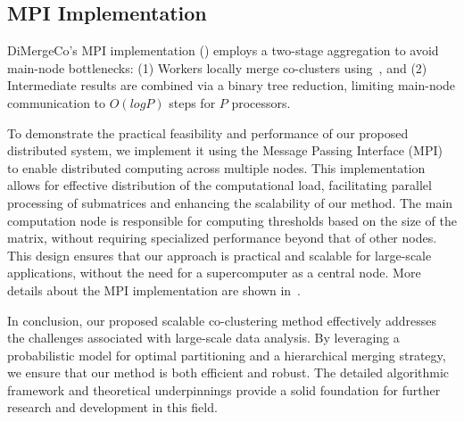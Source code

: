 \documentclass[journal]{IEEEtran}
\begin{document}
\subsection{MPI Implementation}
\label{subsec:mpi_implementation}
DiMergeCo's MPI implementation () employs a two-stage aggregation to avoid main-node bottlenecks: (1) Workers locally merge co-clusters using~, and (2) Intermediate results are combined via a binary tree reduction, limiting main-node communication to $O(log P)$ steps for $P$ processors.

To demonstrate the practical feasibility and performance of our proposed distributed system, we implement it using the Message Passing Interface (MPI) to enable distributed computing across multiple nodes. This implementation allows for effective distribution of the computational load, facilitating parallel processing of submatrices and enhancing the scalability of our method. The main computation node is responsible for computing thresholds based on the size of the matrix, without requiring specialized performance beyond that of other nodes. This design ensures that our approach is practical and scalable for large-scale applications, without the need for a supercomputer as a central node.
More details about the MPI implementation are shown in~.

In conclusion, our proposed scalable co-clustering method effectively addresses the challenges associated with large-scale data analysis. By leveraging a probabilistic model for optimal partitioning and a hierarchical merging strategy, we ensure that our method is both efficient and robust. The detailed algorithmic framework and theoretical underpinnings provide a solid foundation for further research and development in this field.
\end{document}
